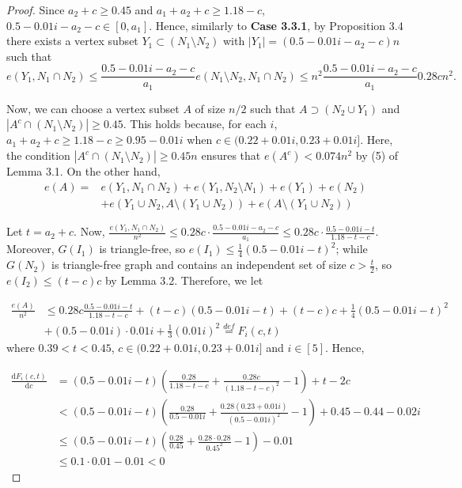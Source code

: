 \documentclass[11pt, oneside]{article}   	%
\begin{document}
\begin{proof}
 Since $a_2+c\geq 0.45$ and  $a_1+a_2+c\geq 1.18-c$, $0.5-0.01i-a_2-c\in[0,a_1]$. Hence, similarly to \textbf{Case 3.3.1}, by Proposition 3.4 there exists a vertex subset $Y_1\subset (N_1\setminus N_2)$ with $|Y_1|=(0.5-0.01i-a_2-c)n$ such that 
 $$e(Y_1,N_1\cap N_2)\leq\frac{0.5-0.01i-a_2-c}{a_1}e(N_1\setminus N_2,N_1\cap N_2)\leq n^2\frac{0.5-0.01i-a_2-c}{a_1}0.28cn^2.$$
 
 Now, we can choose a vertex subset $A$ of size $n/2$ such that $A\supset (N_2\cup Y_1)$ and $|A^c\cap (N_1\setminus N_2)|\geq 0.45$. This holds because, for each $i$, $a_1+a_2+c\geq 1.18-c\geq 0.95-0.01i$ when $c\in (0.22+0.01i,0.23+0.01i]$. Here, the condition $|A^c\cap(N_1\setminus N_2)|\geq 0.45n$ ensures that $e(A^c)<0.074 n^2$ by (5) of Lemma 3.1. On the other hand,
 $$
 \begin{aligned}
     e(A)=& e(Y_1,N_1\cap N_2)+e(Y_1,N_2\setminus N_1)+e(Y_1)+e(N_2) \\
     &+e(Y_1\cup N_2,A\setminus (Y_1\cup N_2))+e(A\setminus (Y_1\cup N_2))
 \end{aligned}
 $$

Let $t=a_2+c$. Now, $\frac{e(Y_1,N_1\cap N_2)}{n^2}\leq 0.28c\cdot \frac{0.5-0.01i-a_2-c}{a_1} \leq 0.28c\cdot\frac{0.5-0.01i-t}{1.18-t-c}$. Moreover, $G(I_1)$ is triangle-free, so $e(I_1)\leq \frac{1}{4}(0.5-0.01i-t)^2$; while $G(N_2)$ is triangle-free graph and contains an independent set of size $c>\frac{t}{2}$, so $e(I_2)\leq (t-c)c$ by Lemma 3.2. Therefore, we let

$$
\begin{aligned}
    \frac{e(A)}{n^2} &\leq 0.28c\frac{0.5-0.01i-t}{1.18-t-c}+(t-c)(0.5-0.01i-t)+(t-c)c+\frac{1}{4}(0.5-0.01i-t)^2
    \\&+(0.5-0.01i)\cdot 0.01i+\frac{1}{3}(0.01i)^2\overset{def}{=}F_i(c,t)
\end{aligned}
$$
where $0.39<t<0.45$, $c\in(0.22+0.01i,0.23+0.01i]$ and $i\in [5]$. Hence,

$$
\begin{aligned}
\frac{\mathrm{d}F_i(c,t)}{\mathrm{d}c}
&=(0.5-0.01i-t)\left(\frac{0.28}{1.18-t-c}+\frac{0.28c}{(1.18-t-c)^2}-1\right)+t-2c\\
&<(0.5-0.01i-t)\left(\frac{0.28}{0.5-0.01i}+\frac{0.28(0.23+0.01i)}{(0.5-0.01i)^2}-1\right)+0.45-0.44-0.02i\\
&\leq (0.5-0.01i-t)\left(\frac{0.28}{0.45}+\frac{0.28\cdot0.28}{0.45^2}-1\right)-0.01\\
&\leq 0.1\cdot 0.01-0.01<0
\end{aligned}
$$


\end{proof}
\end{document}
